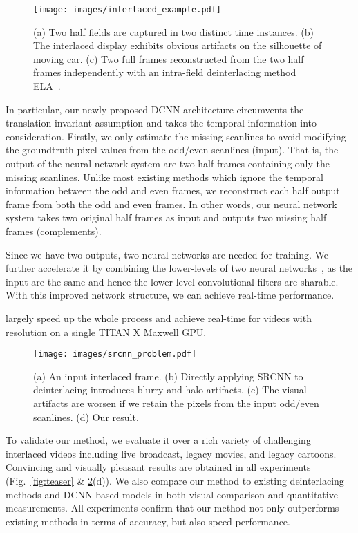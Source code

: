 \documentclass[acmtog]{acmart}
\begin{document}
\begin{figure}[!tp]	
	\texttt{[image: images/interlaced\_example.pdf]}\\
	\caption{(a) Two half fields are captured in two distinct time instances. 
	(b) The interlaced display exhibits obvious artifacts on the silhouette of moving car.
	(c) Two full frames	reconstructed from the two half frames independently with an intra-field deinterlacing method ELA~\cite{doyle1990interlaced}.} \label{fig:interlaced_example}
\end{figure}



In particular, our newly proposed DCNN architecture circumvents the translation-invariant assumption and takes the temporal
information into consideration. Firstly, we only estimate the missing scanlines
to avoid modifying the groundtruth pixel values from the odd/even scanlines
(input). That is, the output of the neural network system are two half frames
containing only the missing scanlines. Unlike most existing methods which ignore the
temporal information between the odd and even frames, we reconstruct each half 
output frame from both the odd and even frames. In other words,
 our
neural network system takes two original half frames as input and outputs two missing half
frames (complements). 

Since we have two outputs, two neural networks are needed for training. 
We further accelerate it by combining the lower-levels of two
neural networks~\cite{bengio2012deep}, as the input are the same and 
hence the lower-level convolutional filters are sharable. 
With this improved network structure, we can achieve real-time performance.

largely speed up the whole process and achieve real-time for videos with
 resolution on a single TITAN X Maxwell GPU. 
\fi 

\begin{figure}[!tp]
\texttt{[image: images/srcnn\_problem.pdf]}\\
\caption{(a) An input interlaced frame. 
(b) Directly applying SRCNN to deinterlacing introduces blurry and halo artifacts. 
(c) The visual artifacts are worsen if we retain the pixels from the input odd/even scanlines. 
(d) Our result.}\label{fig:srcnn_problem} 
\end{figure}

To validate our method, we evaluate it over a rich
variety of challenging interlaced videos including live broadcast, legacy movies,
and legacy cartoons. Convincing and visually pleasant results are obtained in all experiments 
(Fig.~\ref{fig:teaser} \& \ref{fig:srcnn_problem}(d)). We also compare our
method to existing deinterlacing methods and DCNN-based models in both visual comparison and quantitative
measurements. All experiments confirm that our method not
only outperforms existing methods in terms of accuracy, but also
speed performance. 
\end{document}
